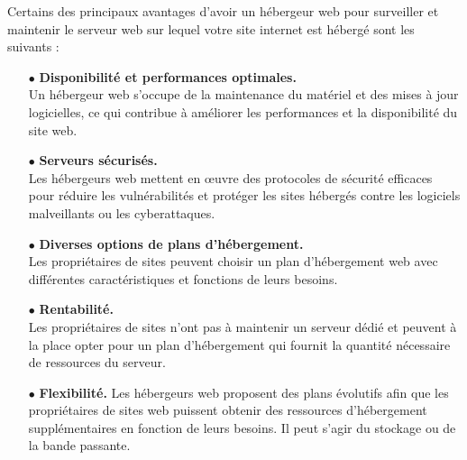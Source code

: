 Certains des principaux avantages d’avoir un hébergeur web pour surveiller et maintenir le serveur web sur lequel votre site internet est hébergé sont les suivants :
\begin{enumerate}
	\item[$\bullet$] \textbf{Disponibilité et performances optimales.\\} Un hébergeur web s’occupe de la maintenance du matériel et des mises à jour logicielles, ce qui contribue à améliorer les performances et la disponibilité du site web.\\
	
 	\item [$\bullet$]\textbf{Serveurs sécurisés.\\} Les hébergeurs web mettent en œuvre des protocoles de sécurité efficaces pour réduire les vulnérabilités et protéger les sites hébergés contre les logiciels malveillants ou les cyberattaques.\\
	\item[$\bullet$] \textbf{Diverses options de plans d’hébergement.\\} Les propriétaires de sites peuvent choisir un plan d’hébergement web avec différentes caractéristiques et fonctions de leurs besoins.\\
	\item[$\bullet$] \textbf{Rentabilité.\\} Les propriétaires de sites n’ont pas à maintenir un serveur dédié et peuvent à la place opter pour un plan d’hébergement qui fournit la quantité nécessaire de ressources du serveur.\\
	\item [$\bullet$]\textbf{Flexibilité.} Les hébergeurs web proposent des plans évolutifs afin que les propriétaires de sites web puissent obtenir des ressources d’hébergement supplémentaires en fonction de leurs besoins. Il peut s’agir du stockage ou de la bande passante.\\
\end{enumerate}
